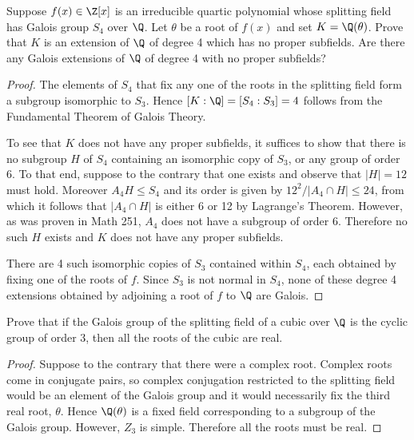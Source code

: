 \documentclass[10pt]{amsart}
\begin{document}
\begin{thm}
  \label{Ex2}
  Suppose $f(x) \in \Z[x]$ is an irreducible quartic polynomial whose splitting field has Galois group $S_4$  over $\Q$.
  Let $\theta$ be a root of $f(x)$ and set $K = \Q(\theta)$. 
  Prove that $K$ is an extension of $\Q$ of degree 4 which has no proper subfields.
  Are there any Galois extensions of $\Q$ of degree 4 with no proper subfields?

  \begin{proof}
    The elements of $S_4$ that fix any one of the roots in the splitting field form a subgroup isomorphic to $S_3$.
    Hence $[K:\Q] = [S_4:S_3] = 4$ follows from the Fundamental Theorem of Galois Theory.
        
    To see that $K$ does not have any proper subfields, it suffices to show that there is no subgroup $H$ of $S_4$ containing an isomorphic copy of $S_3$, or any group of order 6.
    To that end, suppose to the contrary that one exists and observe that $|H| = 12$ must hold.
    Moreover $A_4H \leq S_4$ and its order is given by $12^2/|A_4 \cap H| \leq 24$, from which it follows that $|A_4 \cap H|$ is either 6 or 12 by Lagrange's Theorem.
    However, as was proven in Math 251, $A_4$ does not have a subgroup of order 6.
    Therefore no such $H$ exists and $K$ does not have any proper subfields.

    There are 4 such isomorphic copies of $S_3$ contained within $S_4$, each obtained by fixing one of the roots of $f$.
    Since $S_3$ is not normal in $S_4$, none of these degree 4 extensions obtained by adjoining a root of $f$ to $\Q$ are Galois.
  \end{proof}
\end{thm}

\begin{thm}
  \label{Ex3}
  Prove that if the Galois group of the splitting field of a cubic over $\Q$ is the cyclic group of order 3, then all the roots of the cubic are real.
  
  \begin{proof}
    Suppose to the contrary that there were a complex root.
    Complex roots come in conjugate pairs, so complex conjugation restricted to the splitting field would be an element of the Galois group and it would necessarily fix the third real root, $\theta$.
    Hence $\Q(\theta)$ is a fixed field corresponding to a subgroup of the Galois group.
    However, $Z_3$ is simple.
    Therefore all the roots must be real.
  \end{proof}
\end{thm}
\end{document}
